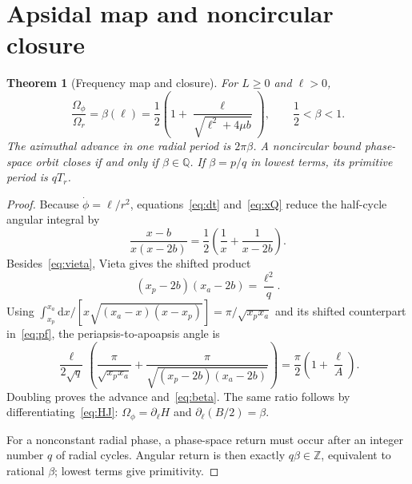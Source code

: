 \documentclass[10pt]{article}
\newtheorem{theorem}{Theorem}
\newcommand{\Q}{\mathbb Q}
\newcommand{\D}{\mathrm d}
\begin{document}
\section{Apsidal map and noncircular closure}
\begin{theorem}[Frequency map and closure]\label{thm:closure}
For \(L\geq0\) and \(\ell>0\),
\begin{equation}\label{eq:beta}
 \frac{\Omega_\phi}{\Omega_r}=\beta(\ell)
 =\frac12\left(1+\frac{\ell}{\sqrt{\ell^2+4\mu b}}\right),
 \qquad \frac12<\beta<1.
\end{equation}
The azimuthal advance in one radial period is \(2\pi\beta\).  A
noncircular bound phase-space orbit closes if and only if
\(\beta\in\Q\).  If \(\beta=p/q\) in lowest terms, its primitive period is
\(qT_r\).
\end{theorem}
\begin{proof}
Because \(\dot\phi=\ell/r^2\), equations~\eqref{eq:dt} and~\eqref{eq:xQ}
reduce the half-cycle angular integral by
\begin{equation}\label{eq:pf}
 \frac{x-b}{x(x-2b)}=\frac12\left(\frac1x+\frac1{x-2b}\right).
\end{equation}
Besides~\eqref{eq:vieta}, Vieta gives the shifted product
\begin{equation}\label{eq:shifted}
 (x_p-2b)(x_a-2b)=\frac{\ell^2}{q}.
\end{equation}
Using
\(
\int_{x_p}^{x_a}\D x/[x\sqrt{(x_a-x)(x-x_p)}]
=\pi/\sqrt{x_px_a}
\)
and its shifted counterpart in~\eqref{eq:pf}, the periapsis-to-apoapsis
angle is
\[
 \frac{\ell}{2\sqrt q}\left(
 \frac\pi{\sqrt{x_px_a}}+
 \frac\pi{\sqrt{(x_p-2b)(x_a-2b)}}\right)
 =\frac\pi2\left(1+\frac\ell A\right).
\]
Doubling proves the advance and~\eqref{eq:beta}.  The same ratio follows by
differentiating~\eqref{eq:HJ}: \(\Omega_\phi=\partial_\ell H\) and
\(\partial_\ell(B/2)=\beta\).

For a nonconstant radial phase, a phase-space return must occur after an
integer number \(q\) of radial cycles.  Angular return is then exactly
\(q\beta\in\mathbb Z\), equivalent to rational \(\beta\); lowest terms
give primitivity.
\end{proof}
\end{document}
